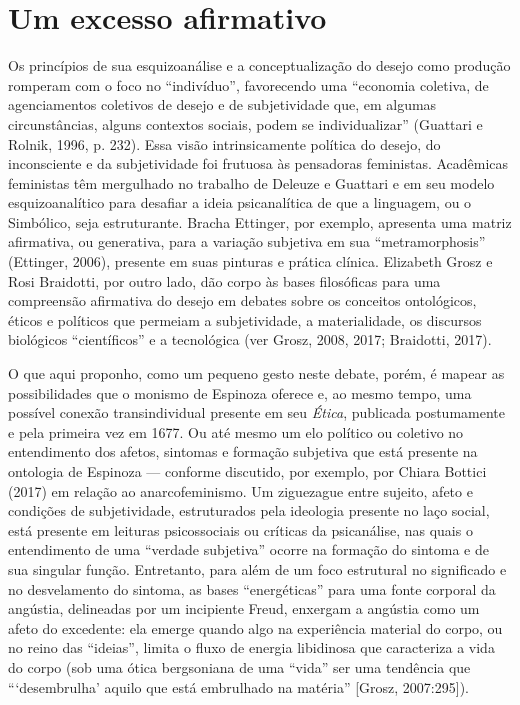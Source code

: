 \section{Um excesso afirmativo}

Os princípios de sua esquizoanálise e a conceptualização do desejo como
produção romperam com o foco no ``indivíduo'', favorecendo uma
``economia coletiva, de agenciamentos coletivos de desejo e de
subjetividade que, em algumas circunstâncias, alguns contextos sociais,
podem se individualizar'' (Guattari e Rolnik, 1996, p. 232). Essa visão
intrinsicamente política do desejo, do inconsciente e da subjetividade
foi frutuosa às pensadoras feministas. Acadêmicas feministas têm
mergulhado no trabalho de Deleuze e Guattari e em seu modelo
esquizoanalítico para desafiar a ideia psicanalítica de que a linguagem,
ou o Simbólico, seja estruturante. Bracha Ettinger, por exemplo,
apresenta uma matriz afirmativa, ou generativa, para a variação
subjetiva em sua ``metramorphosis'' (Ettinger, 2006), presente em suas
pinturas e prática clínica. Elizabeth Grosz e Rosi Braidotti, por outro
lado, dão corpo às bases filosóficas para uma compreensão afirmativa do
desejo em debates sobre os conceitos ontológicos, éticos e políticos que
permeiam a subjetividade, a materialidade, os discursos biológicos
``científicos'' e a tecnológica (ver Grosz, 2008, 2017; Braidotti,
2017).

O que aqui proponho, como um pequeno gesto neste debate, porém, é mapear
as possibilidades que o monismo de Espinoza oferece e, ao mesmo tempo,
uma possível conexão transindividual presente em seu \emph{Ética},
publicada postumamente e pela primeira vez em 1677. Ou até mesmo um elo
político ou coletivo no entendimento dos afetos, sintomas e formação
subjetiva que está presente na ontologia de Espinoza --- conforme
discutido, por exemplo, por Chiara Bottici (2017) em relação ao
anarcofeminismo. Um ziguezague entre sujeito, afeto e condições de
subjetividade, estruturados pela ideologia presente no laço social, está
presente em leituras psicossociais ou críticas da psicanálise, nas quais
o entendimento de uma ``verdade subjetiva'' ocorre na formação do
sintoma e de sua singular função. Entretanto, para além de um foco
estrutural no significado e no desvelamento do sintoma, as bases
``energéticas'' para uma fonte corporal da angústia, delineadas por um
incipiente Freud, enxergam a angústia como um afeto do excedente: ela
emerge quando algo na experiência material do corpo, ou no reino das
``ideias'', limita o fluxo de energia libidinosa que caracteriza a vida
do corpo (sob uma ótica bergsoniana de uma ``vida'' ser uma tendência
que ```desembrulha' aquilo que está embrulhado na matéria'' {[}Grosz,
2007:295{]}).

